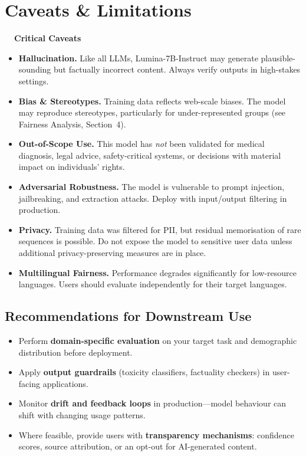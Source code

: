 \section{Caveats \& Limitations}
\label{sec:caveats}

\begin{caveatbox}
  \textbf{\textcolor{warn}{\faExclamationTriangle~~Critical Caveats}}

  \vspace{2pt}
  \begin{itemize}
    \item \textbf{Hallucination.} Like all LLMs, Lumina-7B-Instruct may
    generate plausible-sounding but factually incorrect content. Always verify
    outputs in high-stakes settings.
    \item \textbf{Bias \& Stereotypes.} Training data reflects web-scale biases.
    The model may reproduce stereotypes, particularly for under-represented
    groups (see Fairness Analysis, Section~4).
    \item \textbf{Out-of-Scope Use.} This model has \emph{not} been validated
    for medical diagnosis, legal advice, safety-critical systems, or decisions
    with material impact on individuals' rights.
    \item \textbf{Adversarial Robustness.} The model is vulnerable to prompt
    injection, jailbreaking, and extraction attacks. Deploy with input/output
    filtering in production.
    \item \textbf{Privacy.} Training data was filtered for PII, but residual
    memorisation of rare sequences is possible. Do not expose the model to
    sensitive user data unless additional privacy-preserving measures are in
    place.
    \item \textbf{Multilingual Fairness.} Performance degrades significantly for
    low-resource languages. Users should evaluate independently for their target
    languages.
  \end{itemize}
\end{caveatbox}

\subsection*{Recommendations for Downstream Use}

\begin{itemize}
  \item Perform \textbf{domain-specific evaluation} on your target task and
  demographic distribution before deployment.
  \item Apply \textbf{output guardrails} (toxicity classifiers, factuality
  checkers) in user-facing applications.
  \item Monitor \textbf{drift and feedback loops} in production—model behaviour
  can shift with changing usage patterns.
  \item Where feasible, provide users with \textbf{transparency mechanisms}:
  confidence scores, source attribution, or an opt-out for AI-generated content.
\end{itemize}

